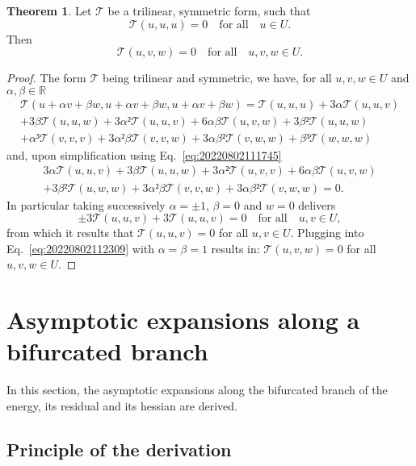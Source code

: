 \documentclass[12pt, final]{scrartcl}
\theoremstyle{definition}
\newtheorem{theorem}{Theorem}
\begin{document}
\begin{theorem}
  \label{thr:20220802112835}
  Let $𝒯$ be a trilinear, symmetric form, such that
  \begin{equation}
    \label{eq:20220802111745}
    𝒯(u, u, u) = 0 \quad \text{for all} \quad u ∈ U.
  \end{equation}
  Then
  \begin{equation}
    𝒯(u, v, w) = 0 \quad \text{for all} \quad u, v, w ∈ U.
  \end{equation}
\end{theorem}
\begin{proof}
  The form $𝒯$ being trilinear and symmetric, we have, for all $u, v, w ∈ U$
  and $α, β ∈ ℝ$
  \begin{multline*}
    𝒯(u + αv + βw, u + αv + βw, u + αv + βw) = 𝒯(u, u, u) + 3α 𝒯(u, u, v)\\
    + 3β 𝒯(u, u, w) + 3α² 𝒯(u, u, v) + 6 α β 𝒯(u, v, w) + 3 β² 𝒯(u, u, w)\\
    + α³ 𝒯(v, v, v) + 3 α² β 𝒯(v, v, w) + 3 α β² 𝒯(v, w, w) + β³ 𝒯(w, w, w)
  \end{multline*}
  and, upon simplification using Eq.~\eqref{eq:20220802111745}
  \begin{multline}
    \label{eq:20220802112309}
    3α 𝒯(u, u, v) + 3β 𝒯(u, u, w) + 3α² 𝒯(u, v, v) + 6 α β 𝒯(u, v, w)\\
    + 3 β² 𝒯(u, w, w) + 3 α² β 𝒯(v, v, w) + 3 α β² 𝒯(v, w, w) = 0.
  \end{multline}
  In particular taking successively $α = ±1$, $β = 0$ and $w = 0$ delivers
  \begin{equation*}
    ±3 𝒯(u, u, v) + 3 𝒯(u, u, v) = 0 \quad \text{for all} \quad u, v ∈ U,
  \end{equation*}
  from which it results that $𝒯(u, u, v) = 0$ for all $u, v ∈ U$. Plugging
  into Eq.~\eqref{eq:20220802112309} with $α = β = 1$ results in:
  $𝒯(u, v, w) = 0$ for all $u, v, w ∈ U$.
\end{proof}

\section{Asymptotic expansions along a bifurcated branch}
\label{sec:20220905060440}

In this section, the asymptotic expansions along the bifurcated branch of the
energy, its residual and its hessian are derived.

\subsection{Principle of the derivation}
\label{sec:20220107121442}
%
\end{document}
